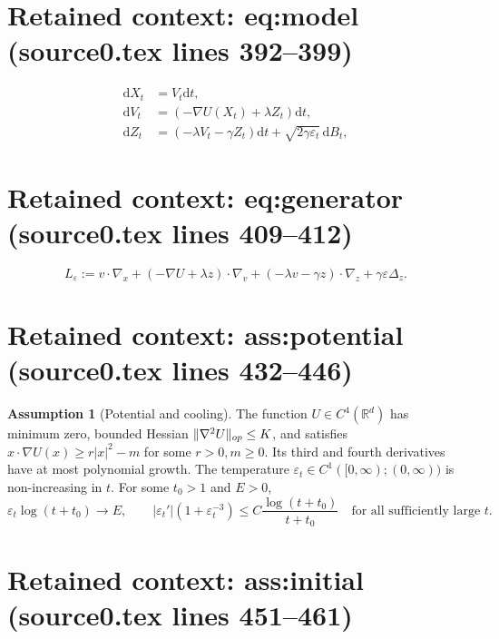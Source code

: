 \documentclass[10pt,a4paper]{amsart}
\newcommand{\R}{\mathbb R}
\newcommand{\dd}{\mathrm d}
\newcommand{\eps}{\varepsilon}
\theoremstyle{plain}
\theoremstyle{definition}
\newtheorem{assumption}[theorem]{Assumption}
\begin{document}
\section*{Retained context: eq:model (source0.tex lines 392--399)}

\begin{equation}\label{eq:model}
\begin{aligned}
 \dd X_t&=V_t\dd t,\\
 \dd V_t&=(-\nabla U(X_t)+\lambda Z_t)\dd t,\\
 \dd Z_t&=(-\lambda V_t-\gamma Z_t)\dd t
                 +\sqrt{2\gamma\eps_t}\,\dd B_t,
\end{aligned}
\end{equation}


\section*{Retained context: eq:generator (source0.tex lines 409--412)}

\begin{equation}\label{eq:generator}
 L_\eps:=v\cdot\nabla_x+(-\nabla U+\lambda z)\cdot\nabla_v
       +(-\lambda v-\gamma z)\cdot\nabla_z+\gamma\eps\Delta_z.
\end{equation}


\section*{Retained context: ass:potential (source0.tex lines 432--446)}

\begin{assumption}[Potential and cooling]\label{ass:potential}
The function $U\in C^4(\R^d)$ has minimum zero, bounded Hessian
$\|\nabla^2U\|_{\rm op}\leq K$, and satisfies
$x\cdot\nabla U(x)\geq r|x|^2-m$ for some $r>0,m\geq0$.
Its third and fourth derivatives have at most polynomial growth.
The temperature $\eps_t\in C^1([0,\infty);(0,\infty))$ is non-increasing in $t$. For
some $t_0>1$ and $E>0$,
\begin{equation}\label{eq:coolingassumption}
 \eps_t\log(t+t_0)\longrightarrow E,
 \qquad
 |\eps_t'|(1+\eps_t^{-3})
 \leq C\frac{\log(t+t_0)}{t+t_0}
 \quad\text{for all sufficiently large }t.
\end{equation}
\end{assumption}


\section*{Retained context: ass:initial (source0.tex lines 451--461)}
\end{document}
